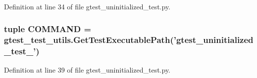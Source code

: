 \-Definition at line 34 of file gtest\-\_\-uninitialized\-\_\-test.\-py.

\hypertarget{namespacegtest__uninitialized__test_add010199942a26d17bd560c1ce462eeb}{
\subsubsection[{\-C\-O\-M\-M\-A\-N\-D}]{\setlength{\rightskip}{0pt plus 5cm}tuple {\bf \-C\-O\-M\-M\-A\-N\-D} = {\bf gtest\-\_\-test\-\_\-utils.\-Get\-Test\-Executable\-Path}('gtest\-\_\-uninitialized\-\_\-test\-\_\-')}}\label{d0/d3d/namespacegtest__uninitialized__test_add010199942a26d17bd560c1ce462eeb}


\-Definition at line 39 of file gtest\-\_\-uninitialized\-\_\-test.\-py.

